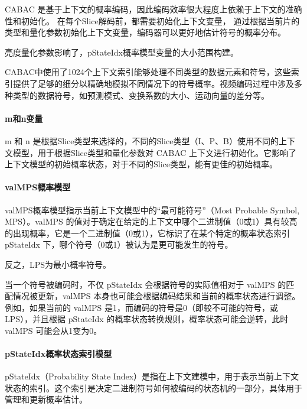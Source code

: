 \documentclass{/Users/hi/Study/template/code}
\begin{document}
CABAC 是基于上下文的概率编码，因此编码效率很大程度上依赖于上下文的准确性和初始化。
在每个Slice解码前，都需要初始化上下文变量，
通过根据当前片的类型和量化参数初始化上下文变量，编码器可以更好地估计符号的概率分布。
\begin{remark}
	亮度量化参数影响了，pStateIdx概率模型变量的大小范围构建。
\end{remark}

CABAC中使用了1024个上下文索引能够处理不同类型的数据元素和符号，这些索引提供了足够的细分以精确地模拟不同情况下的符号概率。视频编码过程中涉及多种类型的数据符号，如预测模式、变换系数的大小、运动向量的差分等。

\paragraph{m和n变量}
m 和 n 是根据Slice类型来选择的，不同的Slice类型（I、P、B）使用不同的上下文模型，用于根据Slice类型和量化参数对 CABAC 上下文进行初始化。它影响了上下文模型的初始概率状态，对于不同的Slice类型，能有更佳的初始概率。

\paragraph{valMPS概率模型}
\begin{definition}
	valMPS概率模型指示当前上下文模型中的“最可能符号”（Most Probable Symbol, MPS）。valMPS 的值对于确定在给定的上下文中哪个二进制值（0或1）具有较高的出现概率，它是一个二进制值（0或1），它标识了在某个特定的概率状态索引 pStateIdx 下，哪个符号（0或1）被认为是更可能发生的符号。
\end{definition}
\begin{remark}
	反之，LPS为最小概率符号。
\end{remark}

当一个符号被编码时，不仅 pStateIdx 会根据符号的实际值相对于 valMPS 的匹配情况被更新，valMPS 本身也可能会根据编码结果和当前的概率状态进行调整。例如，如果当前的 valMPS 是1，而编码的符号是0（即较不可能的符号，或LPS），并且根据 pStateIdx 的概率状态转换规则，概率状态可能会逆转，此时 valMPS 可能会从1变为0。

\paragraph{pStateIdx概率状态索引模型}
\begin{definition}
	pStateIdx（Probability State Index）是指在上下文建模中，用于表示当前上下文状态的索引。这个索引是决定二进制符号如何被编码的状态机的一部分，具体用于管理和更新概率估计。
\end{definition}
\end{document}
